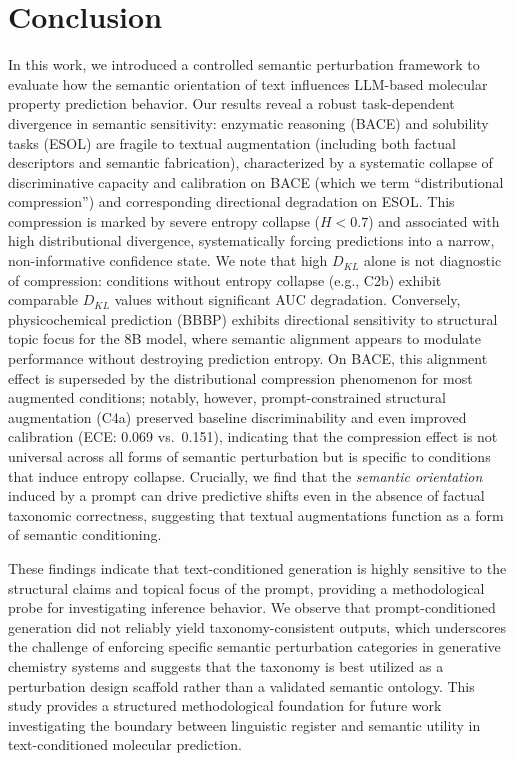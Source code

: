 \section{Conclusion}
\label{sec:conclusion}

In this work, we introduced a controlled semantic perturbation framework to evaluate how the semantic orientation of text influences LLM-based molecular property prediction behavior. Our results reveal a robust task-dependent divergence in semantic sensitivity: enzymatic reasoning (BACE) and solubility tasks (ESOL) are fragile to textual augmentation (including both factual descriptors and semantic fabrication), characterized by a systematic collapse of discriminative capacity and calibration on BACE (which we term ``distributional compression'') and corresponding directional degradation on ESOL. This compression is marked by severe entropy collapse ($H < 0.7$) and associated with high distributional divergence, systematically forcing predictions into a narrow, non-informative confidence state. We note that high $D_{KL}$ alone is not diagnostic of compression: conditions without entropy collapse (e.g., C2b) exhibit comparable $D_{KL}$ values without significant AUC degradation. Conversely, physicochemical prediction (BBBP) exhibits directional sensitivity to structural topic focus for the 8B model, where semantic alignment appears to modulate performance without destroying prediction entropy. On BACE, this alignment effect is superseded by the distributional compression phenomenon for most augmented conditions; notably, however, prompt-constrained structural augmentation (C4a) preserved baseline discriminability and even improved calibration (ECE: 0.069 vs.\ 0.151), indicating that the compression effect is not universal across all forms of semantic perturbation but is specific to conditions that induce entropy collapse. Crucially, we find that the \textit{semantic orientation} induced by a prompt can drive predictive shifts even in the absence of factual taxonomic correctness, suggesting that textual augmentations function as a form of semantic conditioning.

These findings indicate that text-conditioned generation is highly sensitive to the structural claims and topical focus of the prompt, providing a methodological probe for investigating inference behavior. We observe that prompt-conditioned generation did not reliably yield taxonomy-consistent outputs, which underscores the challenge of enforcing specific semantic perturbation categories in generative chemistry systems and suggests that the taxonomy is best utilized as a perturbation design scaffold rather than a validated semantic ontology. This study provides a structured methodological foundation for future work investigating the boundary between linguistic register and semantic utility in text-conditioned molecular prediction.

